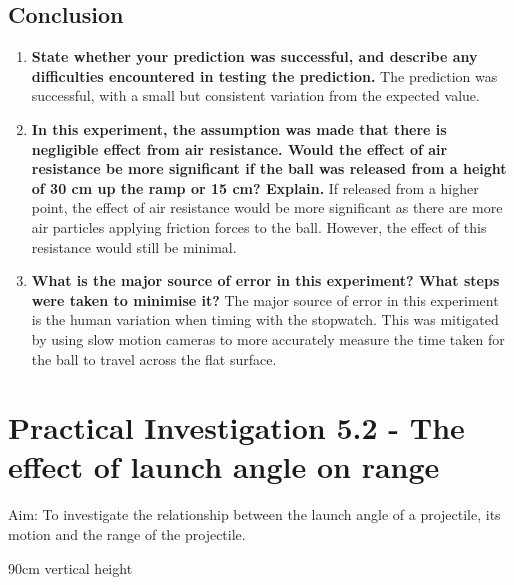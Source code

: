	\subsection{Conclusion}
		\begin{enumerate}
			\item \textbf{State whether your prediction was successful, and describe any difficulties encountered in testing the prediction.}
				\subitem The prediction was successful, with a small but consistent variation from the expected value.
			\item \textbf{In this experiment, the assumption was made that there is negligible effect from air resistance. Would the effect of air resistance be more significant if the ball was released from a height of 30 cm up the ramp or 15 cm? Explain.}
				\subitem If released from a higher point, the effect of air resistance would be more significant as there are more air particles applying friction forces to the ball. However, the effect of this resistance would still be minimal.
			\item \textbf{What is the major source of error in this experiment? What steps were taken to minimise it?}
				\subitem The major source of error in this experiment is the human variation when timing with the stopwatch. This was mitigated by using slow motion cameras to more accurately measure the time taken for the ball to travel across the flat surface.
		\end{enumerate}


\section{Practical Investigation 5.2 - The effect of launch angle on range}

	Aim: To investigate the relationship between the launch angle of a projectile, its motion and the range of the projectile. \;

90cm vertical height
